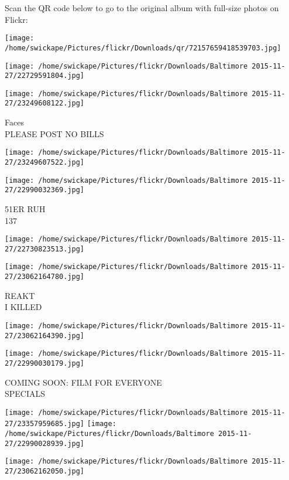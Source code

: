 \documentclass[10pt,letterpaper]{article}
\begin{document}
Scan the QR code below to go to the original album with full-size photos on Flickr:

\texttt{[image: /home/swickape/Pictures/flickr/Downloads/qr/72157659418539703.jpg]}
\pagebreak

\texttt{[image: /home/swickape/Pictures/flickr/Downloads/Baltimore 2015-11-27/22729591804.jpg]}

\vspace{0.25in}
\texttt{[image: /home/swickape/Pictures/flickr/Downloads/Baltimore 2015-11-27/23249608122.jpg]}

Faces\\
PLEASE POST NO BILLS
\pagebreak

\texttt{[image: /home/swickape/Pictures/flickr/Downloads/Baltimore 2015-11-27/23249607522.jpg]}

\vspace{0.25in}
\texttt{[image: /home/swickape/Pictures/flickr/Downloads/Baltimore 2015-11-27/22990032369.jpg]}

51ER RUH\\
137
\pagebreak

\texttt{[image: /home/swickape/Pictures/flickr/Downloads/Baltimore 2015-11-27/22730823513.jpg]}

\vspace{0.25in}
\texttt{[image: /home/swickape/Pictures/flickr/Downloads/Baltimore 2015-11-27/23062164780.jpg]}

REAKT\\
I KILLED
\pagebreak

\texttt{[image: /home/swickape/Pictures/flickr/Downloads/Baltimore 2015-11-27/23062164390.jpg]}

\vspace{0.25in}
\texttt{[image: /home/swickape/Pictures/flickr/Downloads/Baltimore 2015-11-27/22990030179.jpg]}

COMING SOON: FILM FOR EVERYONE\\
SPECIALS
\pagebreak

\texttt{[image: /home/swickape/Pictures/flickr/Downloads/Baltimore 2015-11-27/23357959685.jpg]}
\texttt{[image: /home/swickape/Pictures/flickr/Downloads/Baltimore 2015-11-27/22990028939.jpg]}

\texttt{[image: /home/swickape/Pictures/flickr/Downloads/Baltimore 2015-11-27/23062162050.jpg]}
\end{document}
